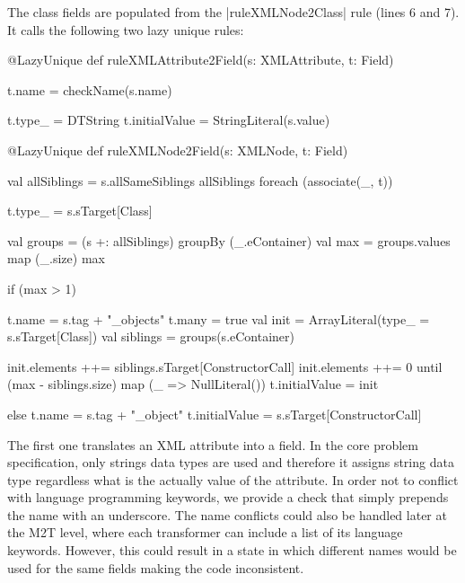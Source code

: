 The class fields are populated from the \Scala|ruleXMLNode2Class| rule (lines 6 and 7).
It calls the following two lazy unique rules:
%
\begin{scalacode}
@LazyUnique
def ruleXMLAttribute2Field(s: XMLAttribute, t: Field) {
  t.name = checkName(s.name)

  t.type_ = DTString
  t.initialValue = StringLiteral(s.value)
}

@LazyUnique
def ruleXMLNode2Field(s: XMLNode, t: Field) {
  val allSiblings = s.allSameSiblings
  allSiblings foreach (associate(_, t))

  t.type_ = s.sTarget[Class]

  val groups = (s +: allSiblings) groupBy (_.eContainer)
  val max = groups.values map (_.size) max

  if (max > 1) {
    t.name = s.tag + "_objects"
    t.many = true
    val init = ArrayLiteral(type_ = s.sTarget[Class])
    val siblings = groups(s.eContainer)
    
    init.elements ++= siblings.sTarget[ConstructorCall]
    init.elements ++= 0 until (max - siblings.size) map (_ => NullLiteral())
    t.initialValue = init
  } else {
    t.name = s.tag + "_object"
    t.initialValue = s.sTarget[ConstructorCall]
  }
}  
\end{scalacode}
%
The first one translates an XML attribute into a field.
In the core problem specification, only strings data types are used and therefore it assigns string data type regardless what is the actually value of the attribute.
In order not to conflict with language programming keywords, we provide a check that simply prepends the name with an underscore.
The name conflicts could also be handled later at the M2T level, where each transformer can include a list of its language keywords.
However, this could result in a state in which different names would be used for the same fields making the code inconsistent.

